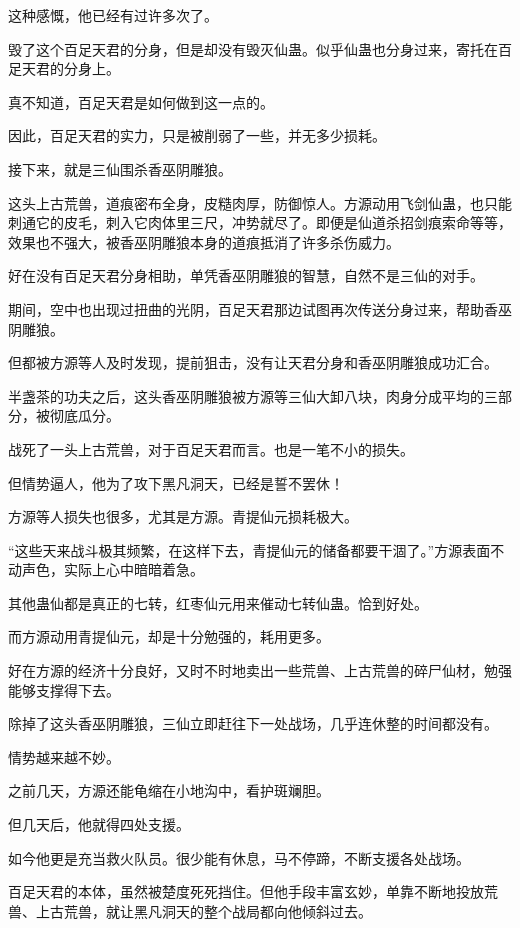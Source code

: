 \begin{this_body}
这种感慨，他已经有过许多次了。

毁了这个百足天君的分身，但是却没有毁灭仙蛊。似乎仙蛊也分身过来，寄托在百足天君的分身上。

真不知道，百足天君是如何做到这一点的。

因此，百足天君的实力，只是被削弱了一些，并无多少损耗。

接下来，就是三仙围杀香巫阴雕狼。

这头上古荒兽，道痕密布全身，皮糙肉厚，防御惊人。方源动用飞剑仙蛊，也只能刺通它的皮毛，刺入它肉体里三尺，冲势就尽了。即便是仙道杀招剑痕索命等等，效果也不强大，被香巫阴雕狼本身的道痕抵消了许多杀伤威力。

好在没有百足天君分身相助，单凭香巫阴雕狼的智慧，自然不是三仙的对手。

期间，空中也出现过扭曲的光阴，百足天君那边试图再次传送分身过来，帮助香巫阴雕狼。

但都被方源等人及时发现，提前狙击，没有让天君分身和香巫阴雕狼成功汇合。

半盏茶的功夫之后，这头香巫阴雕狼被方源等三仙大卸八块，肉身分成平均的三部分，被彻底瓜分。

战死了一头上古荒兽，对于百足天君而言。也是一笔不小的损失。

但情势逼人，他为了攻下黑凡洞天，已经是誓不罢休！

方源等人损失也很多，尤其是方源。青提仙元损耗极大。

“这些天来战斗极其频繁，在这样下去，青提仙元的储备都要干涸了。”方源表面不动声色，实际上心中暗暗着急。

其他蛊仙都是真正的七转，红枣仙元用来催动七转仙蛊。恰到好处。

而方源动用青提仙元，却是十分勉强的，耗用更多。

好在方源的经济十分良好，又时不时地卖出一些荒兽、上古荒兽的碎尸仙材，勉强能够支撑得下去。

除掉了这头香巫阴雕狼，三仙立即赶往下一处战场，几乎连休整的时间都没有。

情势越来越不妙。

之前几天，方源还能龟缩在小地沟中，看护斑斓胆。

但几天后，他就得四处支援。

如今他更是充当救火队员。很少能有休息，马不停蹄，不断支援各处战场。

百足天君的本体，虽然被楚度死死挡住。但他手段丰富玄妙，单靠不断地投放荒兽、上古荒兽，就让黑凡洞天的整个战局都向他倾斜过去。


\end{this_body}
